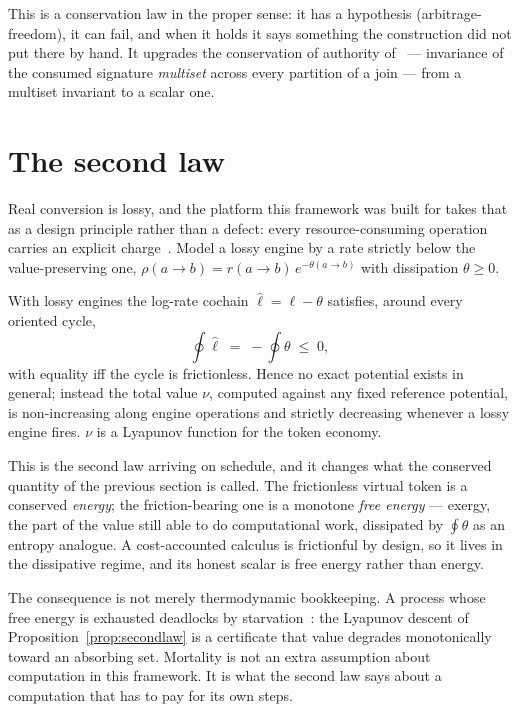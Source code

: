 This is a conservation law in the proper sense: it has a hypothesis
(arbitrage-freedom), it can fail, and when it holds it says something the
construction did not put there by hand.  It upgrades the conservation of
authority of~\cite[Prop.~4.7]{CARho} --- invariance of the consumed
signature \emph{multiset} across every partition of a join --- from a
multiset invariant to a scalar one.

\section{The second law}

Real conversion is lossy, and the platform this framework was built for
takes that as a design principle rather than a defect: every
resource-consuming operation carries an explicit charge~\cite{CARho}.
Model a lossy engine by a rate strictly below the value-preserving one,
$\rho(a\to b) = r(a\to b)\,e^{-\theta(a\to b)}$ with dissipation
$\theta \geq 0$.

\begin{proposition}
\label{prop:secondlaw}
With lossy engines the log-rate cochain $\hat\ell = \ell - \theta$
satisfies, around every oriented cycle,
\[
  \oint \hat\ell \;=\; -\oint \theta \;\leq\; 0,
\]
with equality iff the cycle is frictionless.  Hence no exact potential
exists in general; instead the total value $\nu$, computed against any
fixed reference potential, is non-increasing along engine operations and
strictly decreasing whenever a lossy engine fires.  $\nu$ is a Lyapunov
function for the token economy.
\end{proposition}

\begin{remark}
\label{rmk:exergy}
This is the second law arriving on schedule, and it changes what the
conserved quantity of the previous section is called.  The frictionless
virtual token is a conserved \emph{energy}; the friction-bearing one is a
monotone \emph{free energy} --- exergy, the part of the value still able
to do computational work, dissipated by $\oint\theta$ as an entropy
analogue.  A cost-accounted calculus is frictionful by design, so it lives
in the dissipative regime, and its honest scalar is free energy rather
than energy.

The consequence is not merely thermodynamic bookkeeping.  A process whose
free energy is exhausted deadlocks by starvation~\cite{MC}: the Lyapunov
descent of Proposition~\ref{prop:secondlaw} is a certificate that value
degrades monotonically toward an absorbing set.  Mortality is not an extra
assumption about computation in this framework.  It is what the second law
says about a computation that has to pay for its own steps.
\end{remark}

